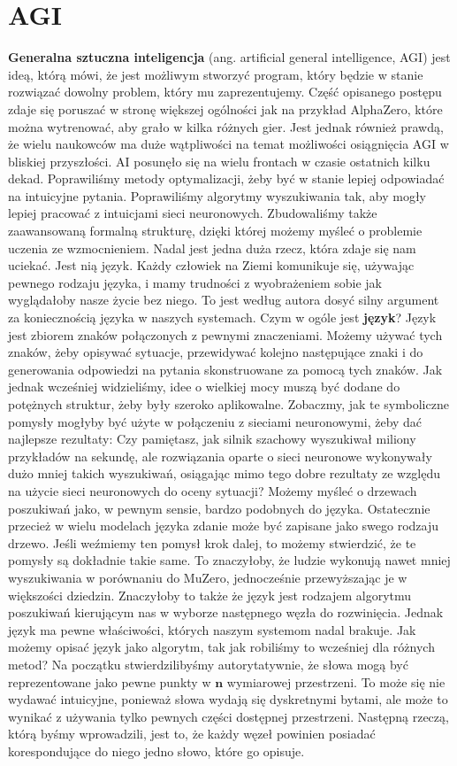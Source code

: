 \section{AGI}

\textbf{Generalna sztuczna inteligencja} (ang. artificial general intelligence, AGI) jest ideą, którą mówi, że jest możliwym stworzyć program, który będzie w stanie rozwiązać dowolny problem, który mu zaprezentujemy. Część opisanego postępu zdaje się poruszać w stronę większej ogólności jak na przykład AlphaZero, które można wytrenować, aby grało w kilka różnych gier. Jest jednak również prawdą, że wielu naukowców ma duże wątpliwości na temat możliwości osiągnięcia AGI w bliskiej przyszłości. AI posunęło się na wielu frontach w czasie ostatnich kilku dekad. Poprawiliśmy metody optymalizacji, żeby być w stanie lepiej odpowiadać na intuicyjne pytania. Poprawiliśmy algorytmy wyszukiwania tak, aby mogły lepiej pracować z intuicjami sieci neuronowych. Zbudowaliśmy także zaawansowaną formalną strukturę, dzięki której możemy myśleć o problemie uczenia ze wzmocnieniem. Nadal jest jedna duża rzecz, która zdaje się nam uciekać. Jest nią język. Każdy człowiek na Ziemi komunikuje się, używając pewnego rodzaju języka, i mamy trudności z wyobrażeniem sobie jak wyglądałoby nasze życie bez niego. To jest według autora dosyć silny argument za koniecznością języka w naszych systemach. Czym w ogóle jest \textbf{język}? Język jest zbiorem znaków połączonych z pewnymi znaczeniami. Możemy używać tych znaków, żeby opisywać sytuacje, przewidywać kolejno następujące znaki i do generowania odpowiedzi na pytania skonstruowane za pomocą tych znaków. Jak jednak wcześniej widzieliśmy, idee o wielkiej mocy muszą być dodane do potężnych struktur, żeby były szeroko aplikowalne. Zobaczmy, jak te symboliczne pomysły mogłyby być użyte w połączeniu z sieciami neuronowymi, żeby dać najlepsze rezultaty: Czy pamiętasz, jak silnik szachowy wyszukiwał miliony przykładów na sekundę, ale rozwiązania oparte o sieci neuronowe wykonywały dużo mniej takich wyszukiwań, osiągając mimo tego dobre rezultaty ze względu na użycie sieci neuronowych do oceny sytuacji? Możemy myśleć o drzewach poszukiwań jako, w pewnym sensie, bardzo podobnych do języka. Ostatecznie przecież w wielu modelach języka zdanie może być zapisane jako swego rodzaju drzewo. Jeśli weźmiemy ten pomysł krok dalej, to możemy stwierdzić, że te pomysły są dokładnie takie same. To znaczyłoby, że ludzie wykonują nawet mniej wyszukiwania w porównaniu do MuZero, jednocześnie przewyższając je w większości dziedzin. Znaczyłoby to także że język jest rodzajem algorytmu poszukiwań kierującym nas w wyborze następnego węzła do rozwinięcia. Jednak język ma pewne właściwości, których naszym systemom nadal brakuje. Jak możemy opisać język jako algorytm, tak jak robiliśmy to wcześniej dla różnych metod? Na początku stwierdzilibyśmy autorytatywnie, że słowa mogą być reprezentowane jako pewne punkty w $\boldsymbol{n}$ wymiarowej przestrzeni. To może się nie wydawać intuicyjne, ponieważ słowa wydają się dyskretnymi bytami, ale może to wynikać z używania tylko pewnych części dostępnej przestrzeni. Następną rzeczą, którą byśmy wprowadzili, jest to, że każdy węzeł powinien posiadać korespondujące do niego jedno słowo, które go opisuje. 